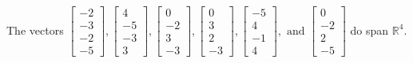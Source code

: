 \begin{exercise}
\begin{exerciseStatement}
  \end{exerciseStatement}
  \begin{exerciseAnswer}
   The vectors \(\left[\begin{array}{r}
-2 \\
-3 \\
-2 \\
-5
\end{array}\right] , \left[\begin{array}{r}
4 \\
-5 \\
-3 \\
3
\end{array}\right] , \left[\begin{array}{r}
0 \\
-2 \\
3 \\
-3
\end{array}\right] , \left[\begin{array}{r}
0 \\
3 \\
2 \\
-3
\end{array}\right] , \left[\begin{array}{r}
-5 \\
4 \\
-1 \\
4
\end{array}\right] , \text{ and } \left[\begin{array}{r}
0 \\
-2 \\
2 \\
-5
\end{array}\right]\) 
  	 do  
	span \(\mathbb{R}^4\).
  


  \end{exerciseAnswer}
\end{exercise}